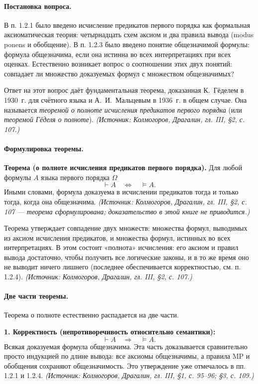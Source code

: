 \documentclass[a4paper,12pt]{article}
\begin{document}
\paragraph{Постановка вопроса.} В п. 1.2.1 было введено исчисление предикатов первого порядка как формальная аксиоматическая теория: четырнадцать схем аксиом и два правила вывода (modus ponens и обобщение). В п. 1.2.3 было введено понятие общезначимой формулы: формула общезначима, если она истинна во всех интерпретациях при всех оценках. Естественно возникает вопрос о соотношении этих двух понятий: совпадает ли множество доказуемых формул с множеством общезначимых?

Ответ на этот вопрос даёт фундаментальная теорема, доказанная К.~Гёделем в 1930~г. для счётного языка и А.~И.~Мальцевым в 1936~г. в общем случае. Она называется \emph{теоремой о полноте исчисления предикатов первого порядка} (или \emph{теоремой Гёделя о полноте}).
\textit{(Источник: Колмогоров, Драгалин, гл. III, §2, с. 107.)}

\paragraph{Формулировка теоремы.}

\textbf{Теорема (о полноте исчисления предикатов первого порядка).} Для любой формулы \(A\) языка первого порядка \(\Omega\)
\[
\vdash A \quad\Longleftrightarrow\quad \models A.
\]
Иными словами, формула доказуема в исчислении предикатов тогда и только тогда, когда она общезначима.
\textit{(Источник: Колмогоров, Драгалин, гл. III, §2, с. 107 — теорема сформулирована; доказательство в этой книге не приводится.)}

Теорема утверждает совпадение двух множеств: множества формул, выводимых из аксиом исчисления предикатов, и множества формул, истинных во всех интерпретациях. В этом состоит «полнота» исчисления: его аксиом и правил вывода достаточно, чтобы получить все логические законы, и в то же время оно не выводит ничего лишнего (последнее обеспечивается корректностью, см. п. 1.2.4).
\textit{(Источник: Колмогоров, Драгалин, гл. III, §2, с. 107.)}

\paragraph{Две части теоремы.} Теорема о полноте естественно распадается на две части.

\textbf{1. Корректность (непротиворечивость относительно семантики):}
\[
\vdash A \quad\Longrightarrow\quad \models A.
\]
Всякая доказуемая формула общезначима. Эта часть доказывается сравнительно просто индукцией по длине вывода: все аксиомы общезначимы, а правила MP и обобщения сохраняют общезначимость. Это утверждение уже отмечалось в пп. 1.2.1 и 1.2.4.
\textit{(Источник: Колмогоров, Драгалин, гл. III, §1, с. 95--96; §3, с. 109.)}
\end{document}
